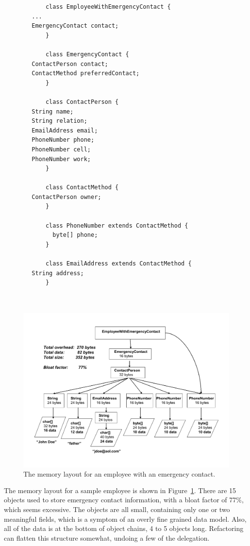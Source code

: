 \ttfamily
\begin{verbatim} 
			class EmployeeWithEmergencyContact {
        ...
        EmergencyContact contact;
			}
			
			class EmergencyContact {
        ContactPerson contact;
        ContactMethod preferredContact;
			}
			
			class ContactPerson {
        String name;
        String relation;
        EmailAddress email;
        PhoneNumber phone;
        PhoneNumber cell;
        PhoneNumber work;
			}
			
			class ContactMethod {
        ContactPerson owner;
			}
			
			class PhoneNumber extends ContactMethod {
			  byte[] phone;
			}
			
			class EmailAddress extends ContactMethod {
        String address;
			}
			
			
\end{verbatim}
\normalfont
 \begin{figure}
  \centering
 \includegraphics[width=.70\textwidth]{Figures/chapter4/employee-status-fine-grained.pdf}
  \caption{The memory layout for an employee with an emergency contact.}
  \label{fig:employee-status-fine-grained}
\end{figure}
The memory layout for a sample employee is shown in Figure~\ref{fig:employee-status-fine-grained}. There are 15 objects used to store emergency contact information, with a bloat factor of 77\%, which seems excessive. The objects are all small, containing only one or two meaningful fields, which is a symptom of an overly fine grained data model. Also, all of the data is at the bottom of object chains, 4 to 5 objects long. Refactoring can flatten this structure somewhat, undoing a few of the delegation.

